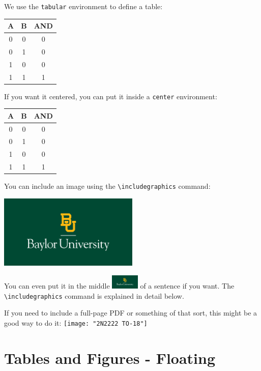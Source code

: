 \documentclass[11pt]{article}
\begin{document}
We use the \texttt{tabular} environment to define a table:

\begin{tabular}{cc|c}
	\toprule
	A & B & AND \\
	\midrule
	0 & 0 & 0 \\
	0 & 1 & 0 \\
	1 & 0 & 0 \\
	1 & 1 & 1 \\
	\bottomrule
\end{tabular} 

If you want it centered, you can put it inside a \texttt{center} environment:

\begin{center}
	\begin{tabular}{cc|c}
		\toprule
		A & B & AND \\
		\midrule
		0 & 0 & 0 \\
		0 & 1 & 0 \\
		1 & 0 & 0 \\
		1 & 1 & 1 \\
		\bottomrule
	\end{tabular} 
\end{center}

You can include an image using the \verb|\includegraphics| command:

\begin{center}
	\includegraphics[width=0.5\textwidth]{BUlogo}
\end{center}

You can even put it in the middle \includegraphics[width=0.1\textwidth]{BUlogo}
of a sentence if you want. The \verb|\includegraphics| command is explained in detail below.

If you need to include a full-page PDF or something of that sort, this might be a good way to do it:
\texttt{[image: "2N2222 TO-18"]}


\section*{Tables and Figures - Floating}
\end{document}
